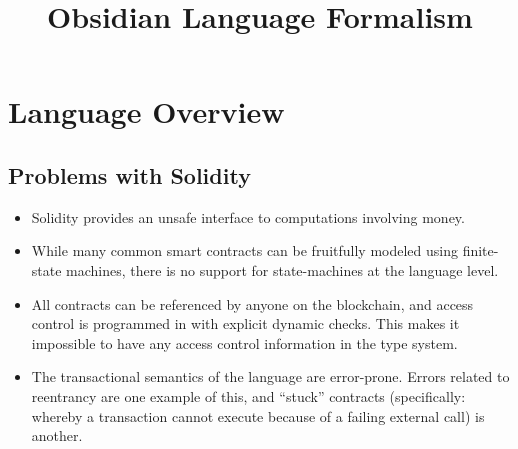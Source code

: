 \documentclass[runningheads,a4paper]{llncs}
\begin{document}
\mainmatter  %

\title{Obsidian Language Formalism}


%
%
\author{}
%
\authorrunning{}

\institute{}

%
%

\maketitle

\newcommand{\pagewidth}{11.75cm}

\newcommand{\inferlbl}[3] {\inferrule{#2}{#3}{\textsf{\footnotesize{\sc #1}}}}

\section{Language Overview}

\iffalse

\subsection{Problems with Solidity}

\begin{itemize}
\item Solidity provides an unsafe interface to computations involving money.
\item While many common smart contracts can be fruitfully modeled using finite-state machines, there is no support for state-machines at the language level.
\item All contracts can be referenced by anyone on the blockchain, and access control is programmed in with explicit dynamic checks. This makes it impossible to have any access control information in the type system.
\item The transactional semantics of the language are error-prone. Errors related to reentrancy are one example of this, and ``stuck'' contracts (specifically: whereby a transaction cannot execute because of a failing external call) is another.
\end{itemize}
\end{document}
